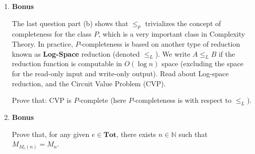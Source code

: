 \documentclass[11pt]{article}
\begin{document}
\begin{enumerate}[{\bf Q1.}]
\item \textbf{Bonus}

The last question part (b) shows that $\leq_p$ trivializes the concept of completeness for the class $P$, which is a very important class in Complexity Theory. In practice, $P$-completeness is based on  another type of reduction known as \textbf{Log-Space} reduction (denoted  $\leq_L$). We write $A\leq_L B$ if the reduction function is computable in $O(\log n)$ space (excluding the space for the read-only input and write-only output). Read about Log-space reduction, and the Circuit Value Problem (CVP). 

Prove that: CVP is $P$-complete (here $P$-completeness is with respect to $\leq_L$).

\item \textbf{Bonus}

Prove that, for any given $e\in\textbf{Tot}$, there exists $n\in\mathbb{N}$ such that $M_{M_e(n)} = M_n.$
 

\end{enumerate}
\end{document}
